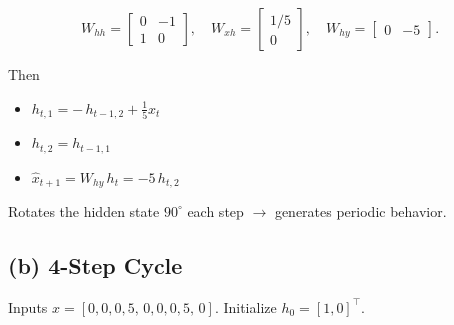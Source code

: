 \documentclass[
]{article}
\providecommand{\tightlist}{%
  \setlength{\itemsep}{0pt}\setlength{\parskip}{0pt}}
\begin{document}
\[W_{hh}=\begin{bmatrix}0 & -1\\ 1 & 0\end{bmatrix},\quad
W_{xh}=\begin{bmatrix}1/5\\ 0\end{bmatrix},\quad
W_{hy}=\begin{bmatrix}0 & -5\end{bmatrix}.\]

Then

\begin{itemize}
\tightlist
\item
  \(h_{t,1} = -\,h_{t-1,2} + \tfrac{1}{5} x_t\)
\item
  \(h_{t,2} = h_{t-1,1}\)
\item
  \(\hat{x}_{t+1} = W_{hy}\,h_t = -5\,h_{t,2}\)
\end{itemize}

Rotates the hidden state \(90^\circ\) each step \(\to\) generates
periodic behavior.

\subsection{(b) 4-Step Cycle}\label{b-4-step-cycle-1}

Inputs \(x=[0,0,0,5,\,0,0,0,5,\,0]\). Initialize \(h_0=[1,0]^\top\).
\end{document}
